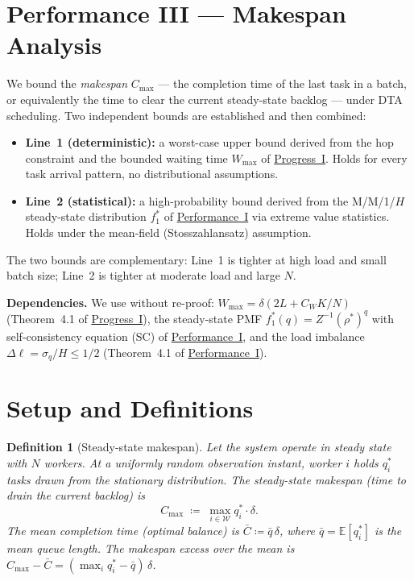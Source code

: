 \documentclass[11pt,a4paper]{article}
\newtheorem{definition}{Definition}[section]
\newcommand{\rhostar}{\rho^{*}}
\newcommand{\Wmax}{W_{\max}}
\newcommand{\qbar}{\bar{q}}
\newcommand{\Dl}{\Delta\ell}
\newcommand{\Cmax}{C_{\max}}
\newcommand{\Cbar}{\bar{C}}
\newcommand{\sigmaq}{\sigma_q}
\begin{document}
\section*{Performance III --- Makespan Analysis}
\label{chap:makespan}


\setcounter{section}{0}

We bound the \emph{makespan} $\Cmax$ --- the completion time of the last task
in a batch, or equivalently the time to clear the current steady-state
backlog --- under DTA scheduling.
Two independent bounds are established and then combined:
\begin{itemize}
  \item \textbf{Line~1 (deterministic):} a worst-case upper bound derived
        from the hop constraint and the bounded waiting time
        $\Wmax$ of \hyperref[chap:bounded_wait]{Progress~I}.
        Holds for every task arrival pattern, no distributional assumptions.
  \item \textbf{Line~2 (statistical):} a high-probability bound derived
        from the M/M/1/$H$ steady-state distribution $f_1^*$ of
        \hyperref[chap:load_balance]{Performance~I} via extreme value statistics.
        Holds under the mean-field (Stosszahlansatz) assumption.
\end{itemize}
The two bounds are complementary: Line~1 is tighter at high load and
small batch size; Line~2 is tighter at moderate load and large $N$.

\noindent\textbf{Dependencies.}
We use without re-proof:
$\Wmax = \delta(2L + C_W K/N)$ (Theorem~4.1 of \hyperref[chap:bounded_wait]{Progress~I}),
the steady-state PMF $f_1^*(q) = Z^{-1}(\rhostar)^q$ with self-consistency
equation (SC) of \hyperref[chap:load_balance]{Performance~I},
and the load imbalance $\Dl = \sigmaq/H \leq 1/2$
(Theorem~4.1 of \hyperref[chap:load_balance]{Performance~I}).

\section{Setup and Definitions}

\begin{definition}[Steady-state makespan]
\label{def:makespan}
Let the system operate in steady state with $N$ workers.
At a uniformly random observation instant, worker $i$ holds $q_i^*$
tasks drawn from the stationary distribution.
The \emph{steady-state makespan} (time to drain the current backlog) is
\[
  \Cmax \;\coloneqq\; \max_{i \in \mathcal{W}} q_i^* \cdot \delta.
\]
The mean completion time (optimal balance) is
$\Cbar \coloneqq \qbar\,\delta$,
where $\qbar = \mathbb{E}[q_i^*]$ is the mean queue length.
The makespan \emph{excess} over the mean is
$\Cmax - \Cbar = (\max_i q_i^* - \qbar)\,\delta$.
\end{definition}
\end{document}
